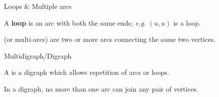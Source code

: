 \documentclass[aspectratio=169]{beamer}
\begin{document}
\begin{frame}{Loops \& Multiple arcs}
	\begin{definition}[{Loop}]
	A \textbf{loop} is an arc with both the same ends; \emph{e.g.} $(u,u)$ is a loop.
\end{definition}
	\begin{definition}
	 (or multi-arcs) are two or more arcs connecting the same two vertices.
	\end{definition}
\end{frame}

\begin{frame}{Multidigraph/Digraph}
	\begin{definition}[{Multidigraph}]
	A  is a digraph which allows repetition of arcs or loops.
	\end{definition}
	\begin{definition}[{Digraph}]
	In a digraph, no more than one arc can join any pair of vertices.
\end{definition}
\end{frame}
\end{document}

